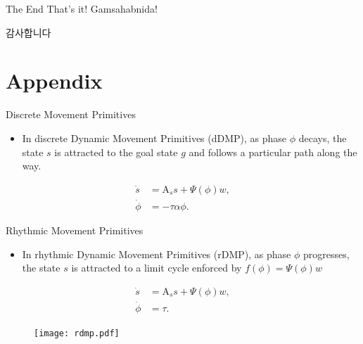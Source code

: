 \documentclass[handout]{beamer}
\newcommand{\boldvec}[1]{\boldsymbol{\mathrm{#1}}}
\let\vec\boldvec
\newcommand{\dmp}{s} %
\newcommand{\goal}{g} %
\newcommand{\force}{\mathit{f}} %
\newcommand{\phase}{\phi} %
\newcommand{\weights}{w} %
\newcommand{\basis}{\Psi} %
\begin{document}
%
\begin{frame}{The End}
That's it! Gamsahabnida!
\begin{CJK}{UTF8}{mj}
감사합니다
\end{CJK}
\end{frame}
%
\section*{Appendix}
%
%
\begin{frame}{Discrete Movement Primitives}
\begin{itemize}
\item In discrete Dynamic Movement Primitives (dDMP), as phase $\phase$ decays, the state $\dmp$ is attracted to the goal state $\goal$ and follows a particular path along the way.
\end{itemize}
\begin{equation}
\begin{aligned}
\dot{\dmp} &= \vec{A}_s \dmp + \basis(\phase) \weights, \\
\dot{\phase} &= -\tau\alpha\phase.
\label{dmp1}
\end{aligned}
\end{equation}
\begin{figure}[ht]
\centering
{}
\label{niceDMPs} 
\end{figure}
\end{frame}
%
\begin{frame}{Rhythmic Movement Primitives}
\begin{itemize}
\item In rhythmic Dynamic Movement Primitives (rDMP), as phase $\phase$ progresses, the state $\dmp$ is attracted to a limit cycle enforced by $\force(\phase) = \basis(\phase)\weights$
\end{itemize}
\begin{equation}
\begin{aligned}
\dot{\dmp} &= \vec{A}_s \dmp + \basis(\phase) \weights, \\
\dot{\phase} &= \tau.
\label{dmp1}
\end{aligned}
\end{equation}
\begin{figure}
\center
\texttt{[image: rdmp.pdf]}			
\end{figure}
\end{frame}
\end{document}
